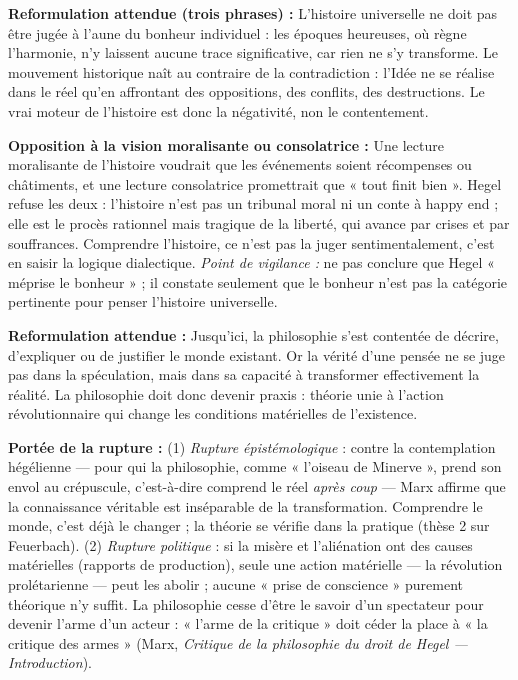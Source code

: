 \documentclass[11pt]{article}
\begin{document}
\begin{corrige}
\textbf{Reformulation attendue (trois phrases) :} L'histoire universelle ne doit pas être jugée à l'aune du bonheur individuel : les époques heureuses, où règne l'harmonie, n'y laissent aucune trace significative, car rien ne s'y transforme. Le mouvement historique naît au contraire de la contradiction : l'Idée ne se réalise dans le réel qu'en affrontant des oppositions, des conflits, des destructions. Le vrai moteur de l'histoire est donc la négativité, non le contentement.

\textbf{Opposition à la vision moralisante ou consolatrice :} Une lecture moralisante de l'histoire voudrait que les événements soient récompenses ou châtiments, et une lecture consolatrice promettrait que « tout finit bien ». Hegel refuse les deux : l'histoire n'est pas un tribunal moral ni un conte à happy end ; elle est le procès rationnel mais tragique de la liberté, qui avance par crises et par souffrances. Comprendre l'histoire, ce n'est pas la juger sentimentalement, c'est en saisir la logique dialectique. \emph{Point de vigilance :} ne pas conclure que Hegel « méprise le bonheur » ; il constate seulement que le bonheur n'est pas la catégorie pertinente pour penser l'histoire universelle.
\end{corrige}

\begin{corrige}
\textbf{Reformulation attendue :} Jusqu'ici, la philosophie s'est contentée de décrire, d'expliquer ou de justifier le monde existant. Or la vérité d'une pensée ne se juge pas dans la spéculation, mais dans sa capacité à transformer effectivement la réalité. La philosophie doit donc devenir praxis : théorie unie à l'action révolutionnaire qui change les conditions matérielles de l'existence.

\textbf{Portée de la rupture :} (1) \emph{Rupture épistémologique} : contre la contemplation hégélienne — pour qui la philosophie, comme « l'oiseau de Minerve », prend son envol au crépuscule, c'est-à-dire comprend le réel \emph{après coup} — Marx affirme que la connaissance véritable est inséparable de la transformation. Comprendre le monde, c'est déjà le changer ; la théorie se vérifie dans la pratique (thèse 2 sur Feuerbach). (2) \emph{Rupture politique} : si la misère et l'aliénation ont des causes matérielles (rapports de production), seule une action matérielle — la révolution prolétarienne — peut les abolir ; aucune « prise de conscience » purement théorique n'y suffit. La philosophie cesse d'être le savoir d'un spectateur pour devenir l'arme d'un acteur : « l'arme de la critique » doit céder la place à « la critique des armes » (Marx, \emph{Critique de la philosophie du droit de Hegel — Introduction}).
\end{corrige}
\end{document}
